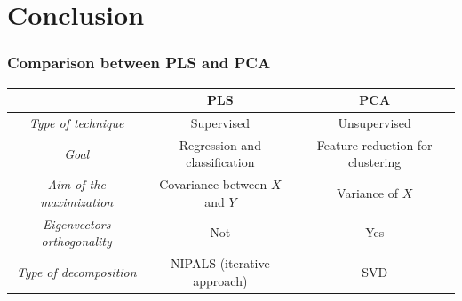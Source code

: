\section{Conclusion}

\begin{frame}
	\frametitle{Comparison between PLS and PCA}
	\begin{table}
		\centering
		\renewcommand\arraystretch{1.3}
		\begin{tabular}{c|c|c}
			\hline
			& \textbf{PLS} & \textbf{PCA} \\
			\hline
			\textit{Type of technique} & Supervised & Unsupervised \\
			\multirow{2}{3cm}{\centering \textit{Goal}} & \multirow{2}{3cm}{\centering Regression and classification} & \multirow{2}{3cm}{\centering Feature reduction for clustering}\\
			& & \\
			\multirow{2}{3cm}{\centering \textit{Aim of the maximization}} & \multirow{2}{3cm}{\centering Covariance between $X$ and $Y$} & \multirow{2}{3cm}{\centering Variance of $X$}\\ 
			& & \\
			\multirow{2}{3cm}{\centering \textit{Eigenvectors orthogonality}} & \multirow{2}{3cm}{\centering Not} & \multirow{2}{3cm}{\centering Yes}\\ 
			& & \\
			\multirow{2}{3cm}{\centering \textit{Type of decomposition}} & \multirow{2}{3cm}{\centering NIPALS (iterative approach)} & \multirow{2}{3cm}{\centering SVD}\\ 
			& & \\
			\hline
		\end{tabular}
	\end{table}
\end{frame}

